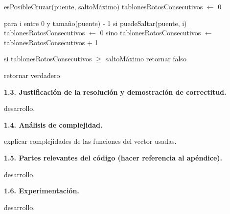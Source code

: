 esPosibleCruzar(puente, saltoMáximo)
  tablonesRotosConsecutivos $\gets$ 0

  para i entre 0 y tamaño(puente) - 1
    si puedeSaltar(puente, i)
      tablonesRotosConsecutivos $\gets$ 0
    sino
      tablonesRotosConsecutivos $\gets$ tablonesRotosConsecutivos + 1

    si tablonesRotosConsecutivos $\geq$ saltoMáximo
      retornar falso

  retornar verdadero


\vspace*{0.75cm} \noindent



\noindent
\textbf{1.3. Justificación de la resolución y demostración de correctitud.}

\vspace*{0.3cm}

desarrollo.


\vspace*{0.75cm} \noindent



\noindent
\textbf{1.4. Análisis de complejidad.}

\vspace*{0.3cm}

explicar complejidades de las funciones del vector usadas.


\vspace*{0.75cm} \noindent



\noindent
\textbf{1.5. Partes relevantes del código (hacer referencia al apéndice).}

\vspace*{0.3cm}

desarrollo.


\vspace*{0.75cm} \noindent



\noindent
\textbf{1.6. Experimentación.}

\vspace*{0.3cm}

desarrollo.
